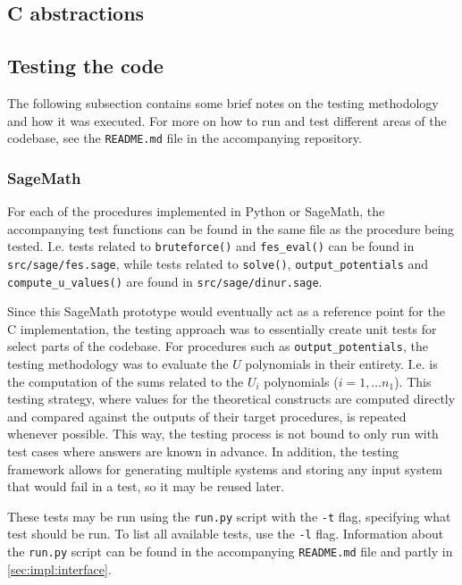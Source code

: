 \subsection{C abstractions} \label{sec:impl:c_abstr}

\subsection{Testing the code}
The following subsection contains some brief notes on the testing methodology and how it was executed. For more on how to run and test different areas of the codebase, see the \texttt{README.md} file in the accompanying repository.

\subsubsection{SageMath}

For each of the procedures implemented in Python or SageMath, the accompanying test functions can be found in the same file as the procedure being tested. I.e. tests related to \texttt{bruteforce()} and \texttt{fes\_eval()} can be found in \texttt{src/sage/fes.sage}, while tests related to \texttt{solve()}, \texttt{output\_potentials} and \texttt{compute\_u\_values()} are found in \texttt{src/sage/dinur.sage}.

Since this SageMath prototype would eventually act as a reference point for the C implementation, the testing approach was to essentially create unit tests for select parts of the codebase. For procedures such as \texttt{output\_potentials}, the testing methodology was to evaluate the $U$ polynomials in their entirety. I.e.
is the computation of the sums related to the $U_i$ polynomials ($i = 1, \dots n_1$). This testing strategy, where values for the theoretical constructs are computed directly and compared against the outputs of their target procedures, is repeated whenever possible. This way, the testing process is not bound to only run with test cases where answers are known in advance. In addition, the testing framework allows for generating multiple systems and storing any input system that would fail in a test, so it may be reused later.

These tests may be run using the \texttt{run.py} script with the \texttt{-t} flag, specifying what test should be run. To list all available tests, use the \texttt{-l} flag. Information about the \texttt{run.py} script can be found in the accompanying \texttt{README.md} file and partly in \cref{sec:impl:interface}.

